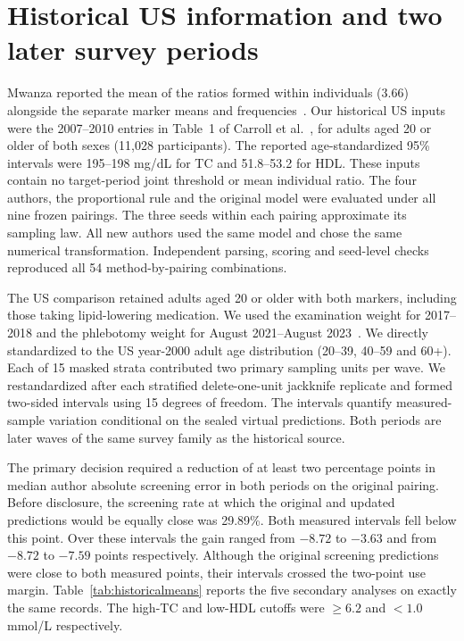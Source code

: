 \section{Historical US information and two later survey periods}
\label{app:historicalmeans}
Mwanza reported the mean of the ratios formed within individuals (3.66) alongside the separate marker means and frequencies~\cite{kavishe}. Our historical US inputs were the 2007--2010 entries in Table~1 of Carroll et al.~\cite{carroll_history}, for adults aged 20 or older of both sexes (11,028 participants). The reported age-standardized 95\% intervals were 195--198 mg/dL for TC and 51.8--53.2 for HDL. These inputs contain no target-period joint threshold or mean individual ratio. The four authors, the proportional rule and the original model were evaluated under all nine frozen pairings. The three seeds within each pairing approximate its sampling law. All new authors used the same model and chose the same numerical transformation. Independent parsing, scoring and seed-level checks reproduced all 54 method-by-pairing combinations.

The US comparison retained adults aged 20 or older with both markers, including those taking lipid-lowering medication. We used the examination weight for 2017--2018 and the phlebotomy weight for August 2021--August 2023~\cite{cdc_lipids_l}. We directly standardized to the US year-2000 adult age distribution (20--39, 40--59 and 60+). Each of 15 masked strata contributed two primary sampling units per wave. We restandardized after each stratified delete-one-unit jackknife replicate and formed two-sided intervals using 15 degrees of freedom. The intervals quantify measured-sample variation conditional on the sealed virtual predictions. Both periods are later waves of the same survey family as the historical source.



The primary decision required a reduction of at least two percentage points in median author absolute screening error in both periods on the original pairing. Before disclosure, the screening rate at which the original and updated predictions would be equally close was 29.89\%. Both measured intervals fell below this point. Over these intervals the gain ranged from $-8.72$ to $-3.63$ and from $-8.72$ to $-7.59$ points respectively. Although the original screening predictions were close to both measured points, their intervals crossed the two-point use margin. Table~\ref{tab:historicalmeans} reports the five secondary analyses on exactly the same records. The high-TC and low-HDL cutoffs were $\geq6.2$ and $<1.0$ mmol/L respectively.

